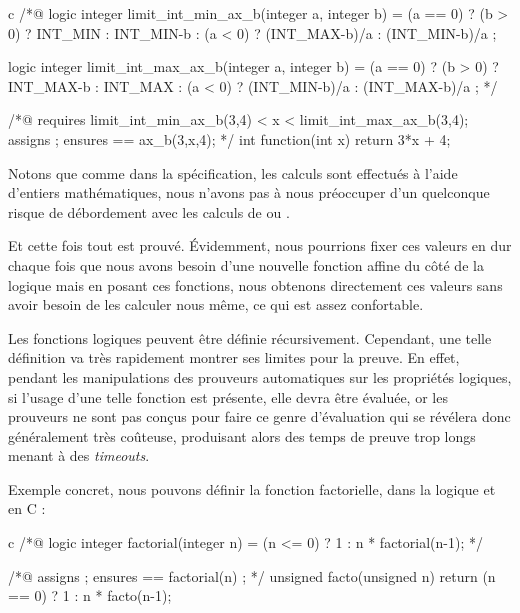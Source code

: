 \documentclass[middle]{zmdocument}
\begin{document}
\begin{CodeBlock}{c}
/*@
  logic integer limit_int_min_ax_b(integer a, integer b) =
    (a == 0) ? (b > 0) ? INT_MIN : INT_MIN-b :
    (a <  0) ? (INT_MAX-b)/a :
               (INT_MIN-b)/a ;

  logic integer limit_int_max_ax_b(integer a, integer b) =
    (a == 0) ? (b > 0) ? INT_MAX-b : INT_MAX :
    (a <  0) ? (INT_MIN-b)/a :
               (INT_MAX-b)/a ;
*/

/*@
  requires limit_int_min_ax_b(3,4) < x < limit_int_max_ax_b(3,4);
  assigns \nothing ;
  ensures \result == ax_b(3,x,4);
*/
int function(int x){
  return 3*x + 4;
}
\end{CodeBlock}



\begin{Information}
Notons que comme dans la spécification, les calculs sont effectués à l'aide 
d'entiers mathématiques, nous n'avons pas à nous préoccuper d'un quelconque
risque de débordement avec les calculs de  ou .
\end{Information}


Et cette fois tout est prouvé. Évidemment, nous pourrions fixer ces valeurs en 
dur chaque fois que nous avons besoin d'une nouvelle fonction affine du côté de
la logique mais en posant ces fonctions, nous obtenons directement ces valeurs 
sans avoir besoin de les calculer nous même, ce qui est assez confortable.





Les fonctions logiques peuvent être définie récursivement. Cependant, une telle
définition va très rapidement montrer ses limites pour la preuve. En effet, 
pendant les manipulations des prouveurs automatiques sur les propriétés 
logiques, si l'usage d'une telle fonction est présente, elle devra être évaluée,
or les prouveurs ne sont pas conçus pour faire ce genre d'évaluation qui se 
révélera donc généralement très coûteuse, produisant alors des temps de preuve
trop longs menant à des \textit{timeouts}.



Exemple concret, nous pouvons définir la fonction factorielle, dans la logique
et en C :



\begin{CodeBlock}{c}
/*@
  logic integer factorial(integer n) = (n <= 0) ? 1 : n * factorial(n-1);
*/

/*@ 
  assigns \nothing ;
  ensures \result == factorial(n) ; 
*/
unsigned facto(unsigned n){
  return (n == 0) ? 1 : n * facto(n-1);
}
\end{CodeBlock}
\end{document}
